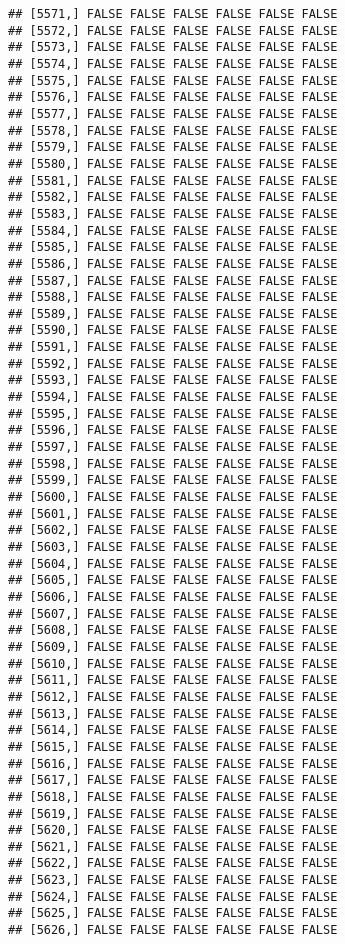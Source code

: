 \documentclass[
]{article}
\begin{document}
\begin{verbatim}
## [5571,] FALSE FALSE FALSE FALSE FALSE FALSE
## [5572,] FALSE FALSE FALSE FALSE FALSE FALSE
## [5573,] FALSE FALSE FALSE FALSE FALSE FALSE
## [5574,] FALSE FALSE FALSE FALSE FALSE FALSE
## [5575,] FALSE FALSE FALSE FALSE FALSE FALSE
## [5576,] FALSE FALSE FALSE FALSE FALSE FALSE
## [5577,] FALSE FALSE FALSE FALSE FALSE FALSE
## [5578,] FALSE FALSE FALSE FALSE FALSE FALSE
## [5579,] FALSE FALSE FALSE FALSE FALSE FALSE
## [5580,] FALSE FALSE FALSE FALSE FALSE FALSE
## [5581,] FALSE FALSE FALSE FALSE FALSE FALSE
## [5582,] FALSE FALSE FALSE FALSE FALSE FALSE
## [5583,] FALSE FALSE FALSE FALSE FALSE FALSE
## [5584,] FALSE FALSE FALSE FALSE FALSE FALSE
## [5585,] FALSE FALSE FALSE FALSE FALSE FALSE
## [5586,] FALSE FALSE FALSE FALSE FALSE FALSE
## [5587,] FALSE FALSE FALSE FALSE FALSE FALSE
## [5588,] FALSE FALSE FALSE FALSE FALSE FALSE
## [5589,] FALSE FALSE FALSE FALSE FALSE FALSE
## [5590,] FALSE FALSE FALSE FALSE FALSE FALSE
## [5591,] FALSE FALSE FALSE FALSE FALSE FALSE
## [5592,] FALSE FALSE FALSE FALSE FALSE FALSE
## [5593,] FALSE FALSE FALSE FALSE FALSE FALSE
## [5594,] FALSE FALSE FALSE FALSE FALSE FALSE
## [5595,] FALSE FALSE FALSE FALSE FALSE FALSE
## [5596,] FALSE FALSE FALSE FALSE FALSE FALSE
## [5597,] FALSE FALSE FALSE FALSE FALSE FALSE
## [5598,] FALSE FALSE FALSE FALSE FALSE FALSE
## [5599,] FALSE FALSE FALSE FALSE FALSE FALSE
## [5600,] FALSE FALSE FALSE FALSE FALSE FALSE
## [5601,] FALSE FALSE FALSE FALSE FALSE FALSE
## [5602,] FALSE FALSE FALSE FALSE FALSE FALSE
## [5603,] FALSE FALSE FALSE FALSE FALSE FALSE
## [5604,] FALSE FALSE FALSE FALSE FALSE FALSE
## [5605,] FALSE FALSE FALSE FALSE FALSE FALSE
## [5606,] FALSE FALSE FALSE FALSE FALSE FALSE
## [5607,] FALSE FALSE FALSE FALSE FALSE FALSE
## [5608,] FALSE FALSE FALSE FALSE FALSE FALSE
## [5609,] FALSE FALSE FALSE FALSE FALSE FALSE
## [5610,] FALSE FALSE FALSE FALSE FALSE FALSE
## [5611,] FALSE FALSE FALSE FALSE FALSE FALSE
## [5612,] FALSE FALSE FALSE FALSE FALSE FALSE
## [5613,] FALSE FALSE FALSE FALSE FALSE FALSE
## [5614,] FALSE FALSE FALSE FALSE FALSE FALSE
## [5615,] FALSE FALSE FALSE FALSE FALSE FALSE
## [5616,] FALSE FALSE FALSE FALSE FALSE FALSE
## [5617,] FALSE FALSE FALSE FALSE FALSE FALSE
## [5618,] FALSE FALSE FALSE FALSE FALSE FALSE
## [5619,] FALSE FALSE FALSE FALSE FALSE FALSE
## [5620,] FALSE FALSE FALSE FALSE FALSE FALSE
## [5621,] FALSE FALSE FALSE FALSE FALSE FALSE
## [5622,] FALSE FALSE FALSE FALSE FALSE FALSE
## [5623,] FALSE FALSE FALSE FALSE FALSE FALSE
## [5624,] FALSE FALSE FALSE FALSE FALSE FALSE
## [5625,] FALSE FALSE FALSE FALSE FALSE FALSE
## [5626,] FALSE FALSE FALSE FALSE FALSE FALSE

\end{verbatim}
\end{document}

